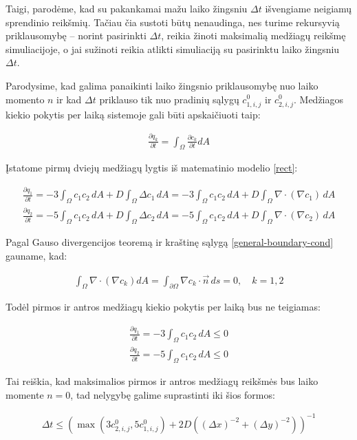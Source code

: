 Taigi, parodėme, kad su pakankamai mažu laiko žingsniu $\Delta t$ išvengiame neigiamų sprendinio reikšmių. Tačiau čia sustoti būtų nenaudinga, nes turime rekursyvią priklausomybę -- norint pasirinkti $\Delta t$, reikia žinoti maksimalią medžiagų reikšmę simuliacijoje, o jai sužinoti reikia atlikti simuliaciją su pasirinktu laiko žingsniu $\Delta t$.

Parodysime, kad galima panaikinti laiko žingsnio priklausomybę nuo laiko momento $n$ ir kad $\Delta t$ priklauso tik nuo pradinių sąlygų $c^0_{1,i,j}$ ir $c^0_{2,i,j}$. Medžiagos kiekio pokytis per laiką sistemoje gali būti apskaičiuoti taip:

\begin{align}
  \frac{\partial q_k}{\partial t} = \int_\Omega \frac{\partial c_k}{\partial t} dA
\end{align}

Įstatome pirmų dviejų medžiagų lygtis iš matematinio modelio \eqref{rect}:

\begin{align}
  \frac{\partial q_1}{\partial t}=-3\int_\Omega c_1c_2\,dA + D\int_\Omega \Delta c_1\,dA=-3\int_\Omega c_1c_2\,dA + D\int_\Omega \nabla \cdot (\nabla c_1)\,dA\\
  \frac{\partial q_2}{\partial t}=-5\int_\Omega c_1c_2\,dA + D\int_\Omega \Delta c_2\,dA=-5\int_\Omega c_1c_2\,dA + D\int_\Omega \nabla \cdot (\nabla c_2)\,dA
\end{align}

\newpage
Pagal Gauso divergencijos teoremą ir kraštinę sąlygą \eqref{general-boundary-cond} gauname, kad:

\begin{align}
\int_\Omega \nabla \cdot (\nabla c_k) dA = \int_{\partial\Omega} \nabla c_k \cdot \vec{n}\, ds = 0,\quad k=1,2
\end{align}

Todėl pirmos ir antros medžiagų kiekio pokytis per laiką bus ne teigiamas:

\begin{align}
  \frac{\partial q_1}{\partial t}=-3\int_\Omega c_1c_2\,dA \leqslant 0\\
  \frac{\partial q_2}{\partial t}=-5\int_\Omega c_1c_2\,dA\leqslant 0
\end{align}

Tai reiškia, kad maksimalios pirmos ir antros medžiagų reikšmės bus laiko momente $n=0$, tad nelygybę galime suprastinti iki šios formos:

\begin{align}
  \Delta t \leqslant \left(\max(3c^{0}_{2,i,j}, 5c^{0}_{1,i,j})+2D\left((\Delta x)^{-2}+(\Delta y)^{-2}\right)\right)^{-1}
\end{align}

